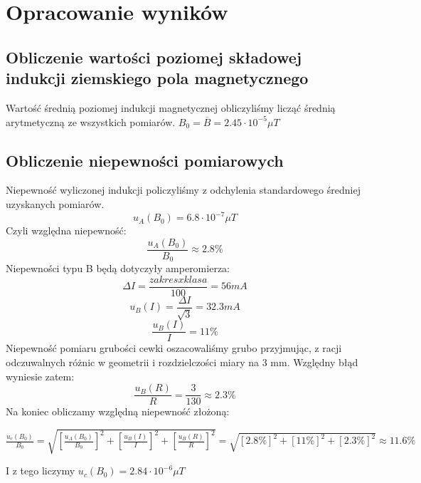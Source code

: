 \documentclass{article}
\begin{document}

\section{Opracowanie wyników}
\subsection{Obliczenie wartości poziomej składowej indukcji ziemskiego pola magnetycznego}
Wartość średnią poziomej indukcji magnetycznej obliczyliśmy licząć średnią arytmetyczną ze wszystkich pomiarów.
$B_0 = \overline{B} = 2.45 \cdot 10^{-5} \mu T$

\subsection{Obliczenie niepewności pomiarowych}
Niepewność wyliczonej indukcji policzyliśmy z odchylenia standardowego średniej uzyskanych pomiarów.
\begin{equation}
u_A(B_0) = 6.8 \cdot 10^{-7} \mu T
\end{equation}
Czyli względna niepewność:
\begin{equation}
\frac{u_A(B_0)}{B_0} \approx 2.8\%
\end{equation}
Niepewności typu B będą dotyczyły amperomierza:
\begin{equation}
\Delta I = \frac{zakres x klasa}{100} = 56 mA
\end{equation}
\begin{equation}
u_B(I) = \frac{\Delta I}{\sqrt{3}} = 32.3 mA 
\end{equation}
\begin{equation}
\frac{u_B(I)}{I} = 11 \%
\end{equation}
Niepewność pomiaru grubości cewki oszacowaliśmy grubo przyjmując, z racji odczuwalnych różnic w geometrii i rozdzielczości miary na 3 mm.
Względny błąd wyniesie zatem:
\begin{equation}
\frac{u_B(R)}{R} = 	\frac{3}{130} \approx 2.3 \%
\end{equation}
Na koniec obliczamy względną niepewność złożoną: \\ \newline
\centerline{$\frac{u_c(B_0)}{B_0} = \sqrt{[\frac{u_A(B_0)}{B_0}]^2 + [\frac{u_B(I)}{I}]^2 + [\frac{u_B(R)}{R}]^2} = \sqrt{[2.8\%]^2+[11\%]^2+[2.3\%]^2} \approx 11.6 \%$}
\newline
\newline
I z tego liczymy $u_c(B_0) = 2.84 \cdot 10^{-6} \mu T$
\end{document}
